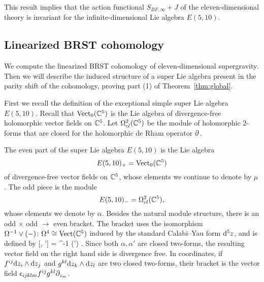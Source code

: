 This result implies that the action functional $S_{BF, \infty} + J$ of the eleven-dimensional theory is invariant for the infinite-dimensional Lie algebra $E(5,10)$. 




\subsection{Linearized BRST cohomology} 

We compute the linearized BRST cohomology of eleven-dimensional supergravity.
Then we will describe the induced structure of a super Lie algebra present in the parity shift of the cohomology, proving part (1) of Theorem~\ref{thm:global}.

\parsec[]

First we recall the definition of the exceptional simple super Lie algebra $E(5,10)$. 
Recall that ${\rm Vect}_0 (\mathbb C^5)$ is the Lie algebra of divergence-free holomorphic vector fields on $\mathbb C^5$.
Let $\Omega^{2}_{cl} (\mathbb C^5)$ be the module of holomorphic $2$-forms that are closed for the holomorphic de Rham operator $\partial$.

The even part of the super Lie algebra $E(5,10)$ is the Lie algebra
\[
E(5,10)_+ = {\rm Vect}_0(\mathbb C^5)
\]
of divergence-free vector fields on $\mathbb C^5$,
whose elements we continue to denote by $\mu$. 
The odd piece is the module 
\[
E(5,10)_- = \Omega^{2}_{cl} (\mathbb C^5),
\]
whose elements we denote by $\alpha$. 
Besides the natural module structure, there is an odd $\times$ odd $\to$ even bracket. 
The bracket uses the isomorphism $\Omega^{-1} \vee (-) \colon \Omega^{4} \cong {\rm Vect} (\mathbb C^5)$ induced by the standard Calabi--Yau form ${\rm d}^5 z$, and is defined by
\beqn\label{eqn:e510}
[\alpha, \alpha'] = \Omega^{-1} \vee (\alpha \wedge \alpha') .
\eeqn
Since both $\alpha, \alpha'$ are closed two-forms,  the resulting vector field on the right hand side is divergence free. 
In coordinates, if $f^{ij} {\rm d} z_i \wedge {\rm d} z_j$ and $g^{kl} {\rm d} z_k \wedge {\rm d} z_l$ are two closed two-forms, their bracket is the vector field $\epsilon_{ijklm} f^{ij}g^{kl} \partial_{z_m}$. 

